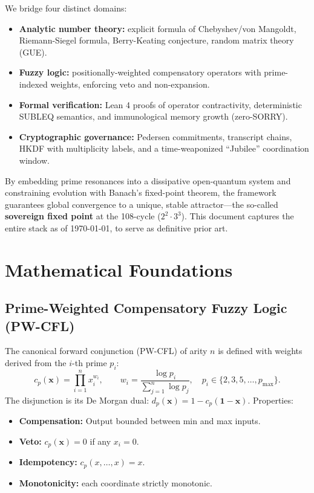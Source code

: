 \documentclass[11pt,a4paper]{article}
\theoremstyle{definition}
\theoremstyle{remark}
\begin{document}
We bridge four distinct domains:
\begin{itemize}
    \item \textbf{Analytic number theory:} explicit formula of Chebyshev/von Mangoldt, Riemann-Siegel formula, Berry-Keating conjecture, random matrix theory (GUE).
    \item \textbf{Fuzzy logic:} positionally-weighted compensatory operators with prime-indexed weights, enforcing veto and non-expansion.
    \item \textbf{Formal verification:} Lean 4 proofs of operator contractivity, deterministic SUBLEQ semantics, and immunological memory growth (zero-SORRY).
    \item \textbf{Cryptographic governance:} Pedersen commitments, transcript chains, HKDF with multiplicity labels, and a time-weaponized ``Jubilee'' coordination window.
\end{itemize}

By embedding prime resonances into a dissipative open-quantum system and constraining evolution with Banach's fixed-point theorem, the framework guarantees global convergence to a unique, stable attractor—the so-called \textbf{sovereign fixed point} at the 108-cycle ($2^2 \cdot 3^3$). This document captures the entire stack as of \today, to serve as definitive prior art.

\section{Mathematical Foundations}
\label{sec:math}

\subsection{Prime-Weighted Compensatory Fuzzy Logic (PW-CFL)}
\label{subsec:pwcfl}

The canonical forward conjunction (PW-CFL) of arity $n$ is defined with weights derived from the $i$-th prime $p_i$:
\begin{equation}\label{eq:pwcfl_conj}
    c_{p}(\mathbf{x}) = \prod_{i=1}^{n} x_i^{w_i}, \qquad 
    w_i = \frac{\log p_i}{\sum_{j=1}^n \log p_j},\quad p_i \in \{2,3,5,\dots, p_{\max}\}.
\end{equation}
The disjunction is its De Morgan dual: $d_p(\mathbf{x}) = 1 - c_p(\mathbf{1}-\mathbf{x})$.  
Properties:
\begin{itemize}
    \item \textbf{Compensation:} Output bounded between min and max inputs.
    \item \textbf{Veto:} $c_p(\mathbf{x})=0$ if any $x_i=0$.
    \item \textbf{Idempotency:} $c_p(x,\dots,x)=x$.
    \item \textbf{Monotonicity:} each coordinate strictly monotonic.
\end{itemize}
\end{document}
